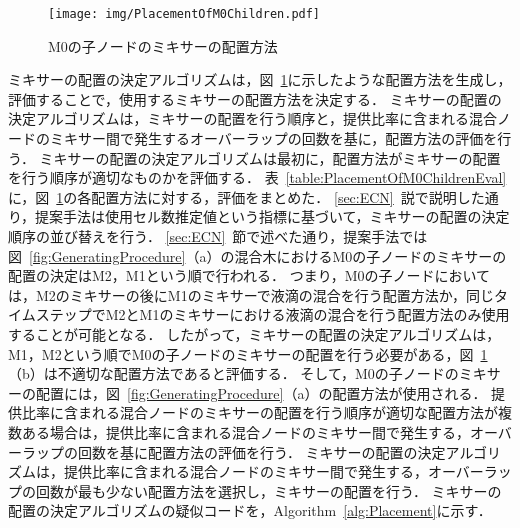\begin{figure}[tbp]
    \centering\texttt{[image: img/PlacementOfM0Children.pdf]}
 \caption{M0の子ノードのミキサーの配置方法}\label{fig:PlacementOfM0Children}
\end{figure}


ミキサーの配置の決定アルゴリズムは，図~\ref{fig:PlacementOfM0Children}に示したような配置方法を生成し，評価することで，使用するミキサーの配置方法を決定する．
ミキサーの配置の決定アルゴリズムは，ミキサーの配置を行う順序と，提供比率に含まれる混合ノードのミキサー間で発生するオーバーラップの回数を基に，配置方法の評価を行う．
ミキサーの配置の決定アルゴリズムは最初に，配置方法がミキサーの配置を行う順序が適切なものかを評価する．
表~\ref{table:PlacementOfM0ChildrenEval}に，図~\ref{fig:PlacementOfM0Children}の各配置方法に対する，評価をまとめた．
\ref{sec:ECN}~説で説明した通り，提案手法は使用セル数推定値という指標に基づいて，ミキサーの配置の決定順序の並び替えを行う．
\ref{sec:ECN}~節で述べた通り，提案手法では図~\ref{fig:GeneratingProcedure}（a）の混合木におけるM0の子ノードのミキサーの配置の決定はM2，M1という順で行われる．
つまり，M0の子ノードにおいては，M2のミキサーの後にM1のミキサーで液滴の混合を行う配置方法か，同じタイムステップでM2とM1のミキサーにおける液滴の混合を行う配置方法のみ使用することが可能となる．
したがって，ミキサーの配置の決定アルゴリズムは，M1，M2という順でM0の子ノードのミキサーの配置を行う必要がある，図~\ref{fig:PlacementOfM0Children}（b）は不適切な配置方法であると評価する．
そして，M0の子ノードのミキサーの配置には，図~\ref{fig:GeneratingProcedure}（a）の配置方法が使用される．
提供比率に含まれる混合ノードのミキサーの配置を行う順序が適切な配置方法が複数ある場合は，提供比率に含まれる混合ノードのミキサー間で発生する，オーバーラップの回数を基に配置方法の評価を行う．
ミキサーの配置の決定アルゴリズムは，提供比率に含まれる混合ノードのミキサー間で発生する，オーバーラップの回数が最も少ない配置方法を選択し，ミキサーの配置を行う．
ミキサーの配置の決定アルゴリズムの疑似コードを，Algorithm~\ref{alg:Placement}に示す．

